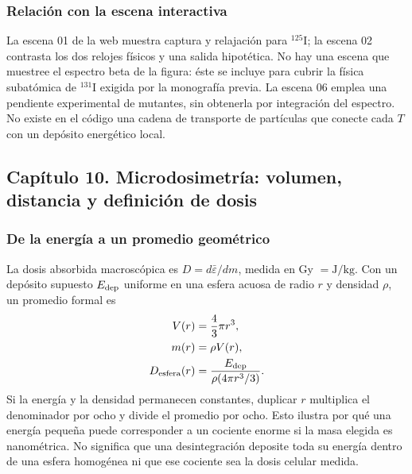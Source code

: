 \documentclass[11pt,a4paper,oneside]{article}
\begin{document}
\subsubsection{Relación con la escena interactiva}
La escena 01 de la web muestra captura y relajación para $^{125}$I; la escena
02 contrasta los dos relojes físicos y una salida hipotética. No hay una
escena que muestree el espectro beta de la figura: éste se incluye para
cubrir la física subatómica de $^{131}$I exigida por la monografía previa.
La escena 06 emplea una pendiente experimental de mutantes, sin obtenerla
por integración del espectro. No existe en el código una cadena de transporte
de partículas que conecte cada $T$ con un depósito energético local.

\clearpage
\subsection{Capítulo 10. Microdosimetría: volumen, distancia y definición de dosis}
\label{ampliacion-micro}

\subsubsection{De la energía a un promedio geométrico}
La dosis absorbida macroscópica es $D=d\bar\varepsilon/dm$, medida en
Gy $=\mathrm{J}/\mathrm{kg}$. Con un depósito supuesto $E_{\rm dep}$ uniforme
en una esfera acuosa de radio $r$ y densidad $\rho$, un promedio formal es
\begin{align}
V(r)&=\frac43\pi r^3,\\
m(r)&=\rho V(r),\\
D_{\rm esfera}(r)&=\frac{E_{\rm dep}}{\rho(4\pi r^3/3)}.
\end{align}
Si la energía y la densidad permanecen constantes, duplicar $r$ multiplica
el denominador por ocho y divide el promedio por ocho. Esto ilustra por qué
una energía pequeña puede corresponder a un cociente enorme si la masa
elegida es nanométrica. No significa que una desintegración deposite toda
su energía dentro de una esfera homogénea ni que ese cociente sea la dosis
celular medida.
\end{document}
